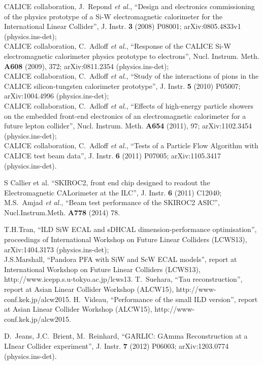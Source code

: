\documentclass{article}
\begin{document}
\begin{thebibliography}{1}
 CALICE collaboration, J.~Repond {\it et al.}, ``Design and electronics
  commissioning of the physics prototype of a Si-W electromagnetic calorimeter
  for the International Linear Collider'', J. Instr. {\bf 3} (2008) P08001; arXiv:0805.4833v1 (physics.ins-det);\\
CALICE collaboration, C.~Adloff {\it et al.}, ``Response of the CALICE Si-W
electromagnetic calorimeter physics prototype to electrons'', Nucl. Instrum.
Meth. {\bf A608} (2009), 372; arXiv:0811.2354 (physics.ins-det);\\
CALICE collaboration, C.~Adloff {\it et al.}, ``Study of the interactions of pions in
the CALICE silicon-tungsten calorimeter prototype'',
J. Instr. {\bf 5} (2010) P05007; arXiv:1004.4996 (physics.ins-det);\\
CALICE collaboration, C.~Adloff {\it et al.},
``Effects of high-energy particle showers on the embedded front-end
electronics of an electromagnetic calorimeter for a future lepton collider'',
Nucl. Instrum.
Meth. {\bf A654} (2011), 97; arXiv:1102.3454 (physics.ins-det);\\
CALICE collaboration, C.~Adloff {\it et al.}, ``Tests of a Particle Flow Algorithm with CALICE test beam data'',
J. Instr. {\bf 6} (2011) P07005; arXiv:1105.3417 (physics.ins-det).

  S Callier et al. ``SKIROC2, front end chip designed to readout the Electromagnetic
CALorimeter at the ILC'', J. Instr. {\bf 6} (2011) C12040;\\
M.S.~Amjad {\it et al.}, ``Beam test performance of the SKIROC2 ASIC'',
Nucl.Instrum.Meth. {\bf A778} (2014) 78.

 T.H.Tran, ``ILD SiW ECAL and sDHCAL dimension-performance
  optimisation'', proceedings of International Workshop on Future Linear Colliders (LCWS13),
arXiv:1404.3173 (physics.ins-det); \\
J.S.Marshall, ``Pandora PFA with SiW and ScW ECAL models'', report at International
Workshop on Future Linear Colliders (LCWS13), http://www.icepp.s.u-tokyo.ac.jp/lcws13.
 T.~Suehara, ``Tau reconstruction'', report at Asian Linear Collider
Workshop (ALCW15), http://www-conf.kek.jp/alcw2015.
 H.~Videau, ``Performance of the small ILD version'', report at Asian Linear Collider
Workshop (ALCW15), http://www-conf.kek.jp/alcw2015.

 D.~Jeans, J.C.~Brient, M.~Reinhard, ``GARLIC: GAmma Reconstruction at a LInear Collider experiment'',
  J. Instr. {\bf 7} (2012) P06003; arXiv:1203.0774 (physics.ins-det).


\end{thebibliography}
\end{document}
